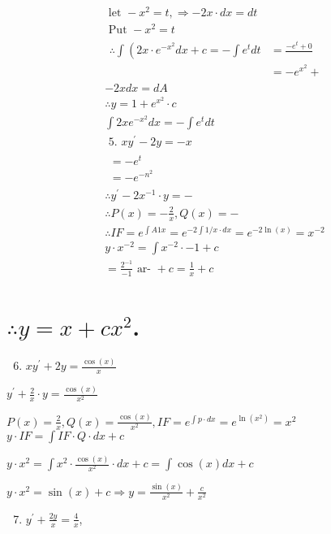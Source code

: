 \documentclass[12pt, a4paper]{article}
\begin{document}
$$
\begin{aligned}
& \text { let }-x^{2}=t, \Rightarrow-2 x \cdot d x=d t \\
& \text { Put }-x^{2}=t \\
& \begin{aligned}
\therefore \int\left(2 x \cdot e^{-x^{2}} d x+c=-\int e^{t} d t\right. & =\frac{-e^{t}+0}{} \\
& =-e^{x^{2}}+
\end{aligned} \\
& -2 x d x=d A \\
& \therefore y=1+e^{x^{2}} \cdot c \\
& \int 2 x e^{-x^{2}} d x=-\int e^{t} d t \\
& \text { 5. } x y^{\prime}-2 y=-x \\
& \begin{array}{l}
=-e^{t} \\
=-e^{-n^{2}}
\end{array} \\
& \therefore y^{\prime}-2 x^{-1} \cdot y=- \\
& \therefore P(x)=-\frac{2}{x}, Q(x)=- \\
& \therefore I F=e^{\int A 1 x}=e^{-2 \int 1 / x \cdot d x}=e^{-2 \ln (x)}=x^{-2} \\
& y \cdot x^{-2}=\int x^{-2} \cdot-1+c \\
& =\frac{2^{-1}}{-1} \text { ar- }+c=\frac{1}{x}+c
\end{aligned}
$$

\section*{$\therefore y=x+c x^{2}$.}
\begin{enumerate}
  \setcounter{enumi}{5}
  \item $x y^{\prime}+2 y=\frac{\cos (x)}{x}$
\end{enumerate}

$y^{\prime}+\frac{2}{x} \cdot y=\frac{\cos (x)}{x^{2}}$

$P(x)=\frac{2}{x}, Q(x)=\frac{\cos (x)}{x^{2}}, I F=e^{\int p \cdot d x}=e^{\ln \left(x^{2}\right)}=x^{2}$ $y \cdot I F=\int I F \cdot Q \cdot d x+c$

$y \cdot x^{2}=\int x^{2} \cdot \frac{\cos (x)}{x^{2}} \cdot d x+c=\int \cos (x) d x+c$

$y \cdot x^{2}=\sin (x)+c \Rightarrow y=\frac{\sin (x)}{x^{2}}+\frac{c}{x^{2}}$

\begin{enumerate}
  \setcounter{enumi}{6}
  \item $y^{\prime}+\frac{2 y}{x}=\frac{4}{x}$,
\end{enumerate}
\end{document}
